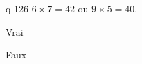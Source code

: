 \begin{truefalse}{q-126}
$6\times 7 = 42$ ou $9\times 5 = 40$.
\item* Vrai
\item Faux
\end{truefalse}


